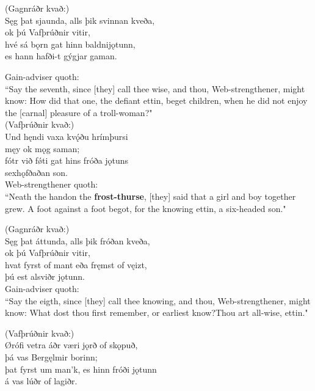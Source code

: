 (Gagnráðr kvað:) \\%
\bva Sęg þat sjaunda, \hld alls þik svinnan kveða, \\%
ok þú Vafþrúðnir vitir, \\%
hvé sá bǫrn gat \hld hinn baldni\footnotemark[25] jǫtunn, \\%
es hann hafði-t gýgjar gaman.\\%

\bvb Gain-adviser quoth: \\ “Say the seventh, since [they] call thee wise, and thou, Web-strengthener, might know: How did that one, the defiant ettin, beget children, when he did not enjoy the [carnal] pleasure of a troll-woman?" \\

(Vafþrúðnir kvað:) \\%
\bva Und hęndi vaxa \hld kvǫ́ðu hrímþursi \\%
męy ok mǫg saman; \\%
fótr við fǿti \hld gat hins fróða jǫtuns \\%
sexhǫfðaðan son.\\%

\bvb Web-strengthener quoth: \\ “Neath the hand\footnotemark[50] on the \textbf{frost-thurse}, [they] said that a girl and boy together grew. A foot against a foot begot, for the knowing ettin, a six-headed son." \\

(Gagnráðr kvað:) \\%
\bva Sęg þat áttunda, \hld alls þik fróðan kveða, \\%
ok þú Vafþrúðnir vitir, \\%
hvat fyrst of mant \hld eða fręmst of vęizt, \\%
þú est alsviðr jǫtunn.\\%

\bvb Gain-adviser quoth: \\ “Say the eigth, since [they] call thee knowing, and thou, Web-strengthener, might know: What dost thou first remember, or earliest know?\footnotemark[55] Thou art all-wise, ettin." \\

(Vafþrúðnir kvað:) \\%
\bva Ørófi vetra \hld áðr væri jǫrð of skǫpuð, \\%
þá vas Bergęlmir borinn; \\%
þat fyrst um man'k, \hld es hinn fróði jǫtunn \\%
á vas lúðr of lagiðr.\footnotemark[30]\\%

